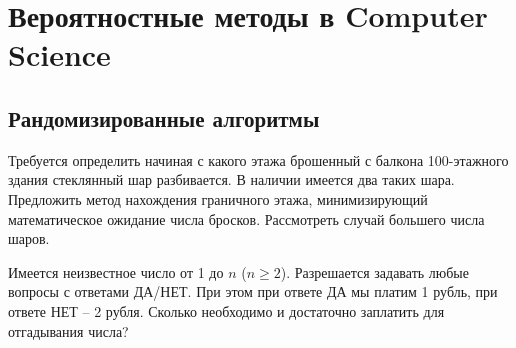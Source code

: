 \section{Вероятностные методы в Computer Science}

\subsection{Рандомизированные алгоритмы}

\begin{problem}

Требуется определить начиная с какого этажа брошенный с балкона 100-этажного здания стеклянный шар разбивается. В наличии имеется два таких шара. Предложить метод нахождения граничного этажа, минимизирующий математическое ожидание числа бросков. Рассмотреть случай большего числа шаров.  

\end{problem}


\begin{problem}
Имеется неизвестное число от 1 до $n$ ($n\ge 2$). Разрешается задавать любые вопросы с ответами ДА/НЕТ. При этом при ответе ДА мы платим 1 рубль, при ответе НЕТ -- 2 рубля. Сколько необходимо и достаточно заплатить для отгадывания числа?
\end{problem}

